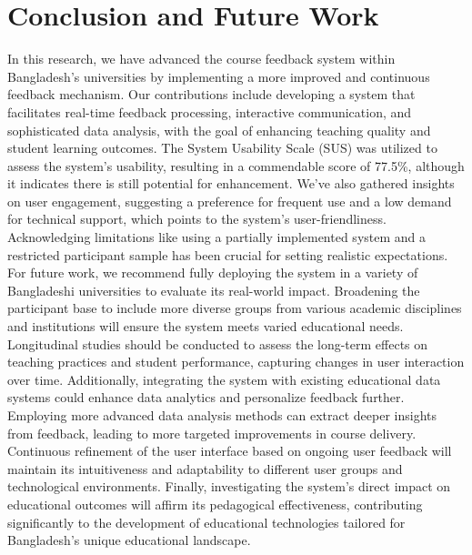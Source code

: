 \documentclass[conference]{IEEEtran}
\begin{document}
    \section{Conclusion and Future Work}

    In this research, we have advanced the course feedback system within Bangladesh's universities by implementing a more improved and continuous feedback mechanism. Our contributions include developing a system that facilitates real-time feedback processing, interactive communication, and sophisticated data analysis, with the goal of enhancing teaching quality and student learning outcomes. The System Usability Scale (SUS) was utilized to assess the system's usability, resulting in a commendable score of 77.5\%, although it indicates there is still potential for enhancement. We've also gathered insights on user engagement, suggesting a preference for frequent use and a low demand for technical support, which points to the system's user-friendliness. Acknowledging limitations like using a partially implemented system and a restricted participant sample has been crucial for setting realistic expectations. For future work, we recommend fully deploying the system in a variety of Bangladeshi universities to evaluate its real-world impact. Broadening the participant base to include more diverse groups from various academic disciplines and institutions will ensure the system meets varied educational needs. Longitudinal studies should be conducted to assess the long-term effects on teaching practices and student performance, capturing changes in user interaction over time. Additionally, integrating the system with existing educational data systems could enhance data analytics and personalize feedback further. Employing more advanced data analysis methods can extract deeper insights from feedback, leading to more targeted improvements in course delivery. Continuous refinement of the user interface based on ongoing user feedback will maintain its intuitiveness and adaptability to different user groups and technological environments. Finally, investigating the system's direct impact on educational outcomes will affirm its pedagogical effectiveness, contributing significantly to the development of educational technologies tailored for Bangladesh's unique educational landscape.



\end{document}
